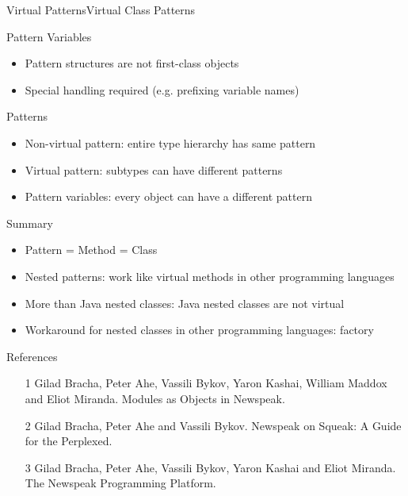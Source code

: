 \documentclass[xcolor=dvipsname,handout]{beamer} %
\begin{document}
\begin{frame}[fragile]{Virtual Patterns}{Virtual Class Patterns}

\end{frame}

\begin{frame}{Pattern Variables}
  \begin{itemize}
    \item Pattern structures are not first-class objects
    \item Special handling required (e.g. prefixing variable names)
  \end{itemize}
\end{frame}

\begin{frame}{Patterns}
  \begin{itemize}
    \item Non-virtual pattern: entire type hierarchy has same pattern
    \item Virtual pattern: subtypes can have different patterns
    \item Pattern variables: every object can have a different pattern
  \end{itemize}
\end{frame}

\begin{frame}{Summary}
\begin{itemize}
  \item Pattern = Method = Class
  \item Nested patterns: work like virtual methods in other programming languages
  \item More than Java nested classes: Java nested classes are not virtual
  \item Workaround for nested classes in other programming languages: factory
\end{itemize}
\end{frame}

\begin{frame}{References}
\begin{itemize}
  \item [1] Gilad Bracha, Peter Ahe, Vassili Bykov, Yaron Kashai, William Maddox and Eliot Miranda. Modules as Objects in Newspeak.
  \item [2] Gilad Bracha, Peter Ahe and Vassili Bykov. Newspeak on Squeak: A Guide for the Perplexed.
  \item [3] Gilad Bracha, Peter Ahe, Vassili Bykov, Yaron Kashai and Eliot Miranda. The Newspeak Programming Platform. 
\end{itemize}
\end{frame}
\end{document}
